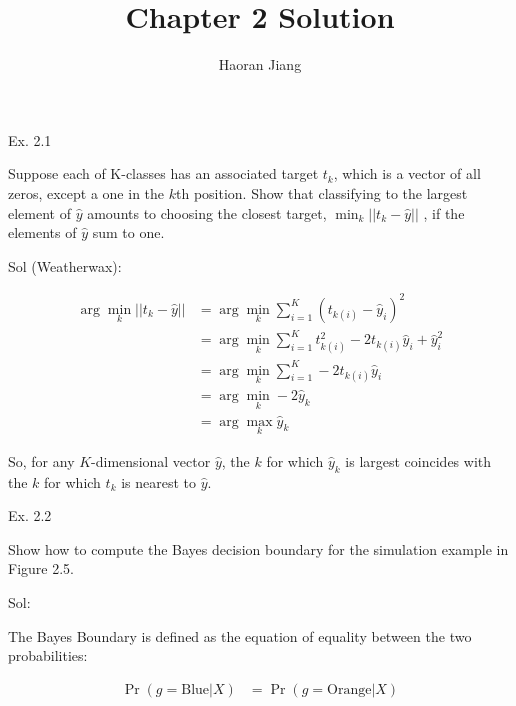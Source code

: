 \documentclass[english]{article}\usepackage[]{graphicx}\usepackage[]{color}
\begin{document}
\title{Chapter 2 Solution}

\author{Haoran Jiang}

\maketitle
Ex. 2.1 \vspace{0.5cm}

Suppose each of K-classes has an associated target $t_{k}$, which
is a vector of all zeros, except a one in the $k$th position. Show
that classifying to the largest element of $\hat{y}$ amounts to choosing
the closest target, $\min_{k}||t_{k}-\hat{y}||$ , if the elements
of $\hat{y}$ sum to one.

\vspace{0.5cm}

Sol (Weatherwax): 

\begin{align*}
\arg\min_{k}||t_{k}-\hat{y}|| & =\arg\min_{k}\sum_{i=1}^{K}(t_{k(i)}-\hat{y}_{i})^{2}\\
 & =\arg\min_{k}\sum_{i=1}^{K}t_{k(i)}^{2}-2t_{k(i)}\hat{y}_{i}+\hat{y}_{i}^{2}\\
 & =\arg\min_{k}\sum_{i=1}^{K}-2t_{k(i)}\hat{y}_{i}\\
 & =\arg\min_{k}-2\hat{y}_{k}\\
 & =\arg\max_{k}\hat{y}_{k}
\end{align*}

So, for any $K$-dimensional vector $\hat{y}$, the $k$ for which
$\hat{y}_{k}$ is largest coincides with the $k$ for which $t_{k}$
is nearest to $\hat{y}$.

\vspace{0.5cm}

Ex. 2.2

\vspace{0.5cm}

Show how to compute the Bayes decision boundary for the simulation
example in Figure 2.5.

\vspace{0.5cm}

Sol:

The Bayes Boundary is defined as the equation of equality between
the two probabilities:

\begin{align*}
\Pr(g=\mathrm{Blue}|X) & =\Pr(g=\mathrm{Orange}|X)
\end{align*}

\vspace{0.5cm}
\end{document}
